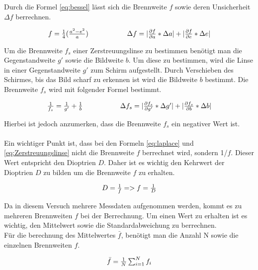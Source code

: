 \documentclass[12pt,a4paper,twoside]{article}
\begin{document}
\noindent
Durch die Formel \ref{eq:bessel} lässt sich die Brennweite $f$ sowie deren Unsicherheit $\Delta f$ berrechnen. 

\begin{equation}
    \label{eq:bessel}
    \centerline{$f=\frac{1}{4} (\frac{a^2 - e^2}{a})$ \\ $\Delta f = \vert \frac{\partial f}{\partial a} * \Delta a \vert + \vert \frac{\partial f}{\partial e} * \Delta e \vert$}
\end{equation}

\noindent
Um die Brennweite $f_s$ einer Zerstreuungslinse zu bestimmen benötigt man die Gegenstandweite $g'$ sowie die Bildweite $b$. 
Um diese zu bestimmen, wird die Linse in einer Gegenstandweite $g'$ zum Schirm aufgestellt. Durch Verschieben des Schirmes, bis das Bild scharf zu erkennen ist wird die Bildweite $b$ bestimmt. Die Brennweite $f_s$ wird mit folgender Formel bestimmt. 

\begin{equation}
    \label{eq:Zerstreuungslinse}
    \centerline{$\frac{1}{f_s}=\frac{1}{g'} + \frac{1}{b}$ \\ $\Delta f_s = \vert \frac{\partial f_s}{\partial g'} * \Delta g' \vert + \vert \frac{\partial f_s}{\partial b} * \Delta b \vert$}
\end{equation}

\noindent
Hierbei ist jedoch anzumerken, dass die Brennweite $f_s$ ein negativer Wert ist. 
\\
\\
Ein wichtiger Punkt ist, dass bei den Formeln \ref{eq:laplace} und \ref{eq:Zerstreuungslinse} nicht die Brennweite $f$ berrechnet wird, sondern 1/$f$. Dieser Wert entspricht den Dioptrien $D$. Daher ist es wichtig den Kehrwert der Dioptrien $D$ zu bilden um die Brennweite $f$ zu erhalten. 

\begin{equation}
    \label{eq:Dioptirn}
    \centerline{$D = \frac{1}{f}=> f = \frac{1}{D}$}
\end{equation}

\noindent
Da in diesem Versuch mehrere Messdaten aufgenommen werden, kommt es zu mehreren Brennweiten $f$ bei der Berrechnung. Um einen Wert zu erhalten ist es wichtig, den Mittelwert sowie die Standardabweichung zu berrechnen. 
\\
Für die berechnung des Mittelwertes $\bar{f}$, benötigt man die Anzahl N sowie die einzelnen Brennweiten $f$. 

\begin{equation}
    \label{eq:Mittelwert}
    \centerline{$\bar{f} = \frac{1}{N} \sum_{i = 1}^{N} f_i $} 
\end{equation}
\end{document}
